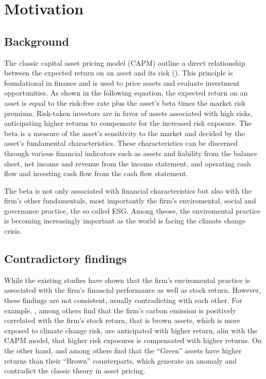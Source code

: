 \documentclass[12pt]{article}
\begin{document}
\doublespacing

\section{Motivation}
\subsection{Background}
The classic capital asset pricing model (CAPM) outline a direct relationship between the expected return on an asset and its risk (\cite{sharpe1964capital}). This principle is foundational in finance and is used to price assets and evaluate investment opportunities. As shown in the following equation, the expected return on an asset is equal to the risk-free rate plus the asset's beta times the market risk premium. Risk-taken investors are in favor of assets associated with high risks, anticipating higher returns to compensate for the increased risk exposure. The beta is a measure of the asset's sensitivity to the market and decided by the asset's fundamental characteristics. These characteristics can be discerned through various financial indicators such as assets and liability from the balance sheet, net income and revenue from the income statement, and operating cash flow and investing cash flow from the cash flow statement. 

The beta is not only associated with financial characteristics but also with the firm's other fundamentals, most importantly the firm's enviromental, social and governance practice, the so called ESG. Among theose, the enviromental practice is becoming increasingly important as the world is facing the climate change crisis. 

\subsection{Contradictory findings}
While the existing studies have shown that the firm's enviromental practice is associated with the firm's financial performance as well as stock return. However, these findings are not consistent, usually contradicting with each other. For example, \cite{bolton2021investors}, \cite{aswani2023carbon} among others find that the firm's carbon emission is positively correlated with the firm's stock return, that is brown assets, which is more exposed to climate change risk, are anticipated with higher return, alin with the CAPM model, that higher risk exposures is compensated with higher returns. On the other hand, \cite{pastor2022dissecting} and \cite{ardia2022climate} among others find that the ``Green'' assets have higher returns than their ``Brown'' counterparts, which generate an anomaly and contradict the classic theory in asset pricing.
\end{document}

